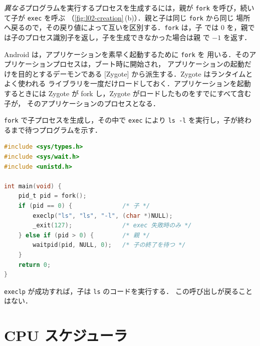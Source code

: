 \documentclass[../main.tex]{subfiles}
\begin{document}
\emph{異なる}プログラムを実行するプロセスを生成するには，親が
\texttt{fork} を呼び，続いて子が \texttt{exec} を呼ぶ
（\cref{fig:l02-creation}\,(b)）．親と子は同じ \texttt{fork} から同じ
場所へ戻るので，その戻り値によって互いを区別する．\texttt{fork} は，子
では 0 を，親では子のプロセス識別子を返し，子を生成できなかった場合は親
で $-1$ を返す．

Android は，アプリケーションを素早く起動するために \texttt{fork} を
用いる．そのアプリケーションプロセスは，ブート時に開始され，
アプリケーションの起動だけを目的とするデーモンである
[Zygote] から派生する．Zygote はランタイムとよく使われる
ライブラリを一度だけロードしておく．アプリケーションを起動するときには
Zygote が fork し，Zygote がロードしたものをすでにすべて含む子が，
そのアプリケーションのプロセスとなる．

\begin{example}
  \texttt{fork} で子プロセスを生成し，その中で \texttt{exec} により
  \texttt{ls -l} を実行し，子が終わるまで待つプログラムを示す．%
  \begin{lstlisting}[language=C, numbers=none]
#include <sys/types.h>
#include <sys/wait.h>
#include <unistd.h>

int main(void) {
    pid_t pid = fork();
    if (pid == 0) {              /* 子 */
        execlp("ls", "ls", "-l", (char *)NULL);
        _exit(127);              /* exec 失敗時のみ */
    } else if (pid > 0) {        /* 親 */
        waitpid(pid, NULL, 0);   /* 子の終了を待つ */
    }
    return 0;
}
\end{lstlisting}
  \texttt{execlp} が成功すれば，子は \texttt{ls} のコードを実行する．
  この呼び出しが戻ることはない．
\end{example}

\section{CPU スケジューラ}
\label{sec:l02-scheduler}
\end{document}
